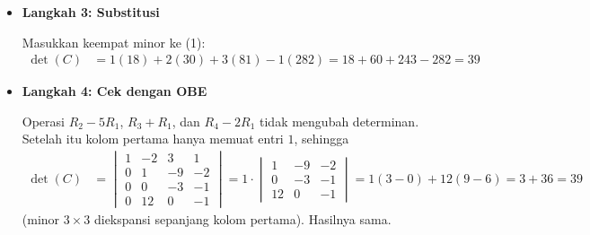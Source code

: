 \documentclass[10pt,a4paper]{article}
\begin{document}
\begin{enumerate}
\begin{enumerate}
\begin{itemize}
Hapus baris 1 dan kolom yang bersesuaian, lalu ekspansi setiap minor sepanjang baris pertamanya:
\begin{align}
M_{11} &= \begin{vmatrix} -9 & 6 & 3 \\ 2 & -6 & -2 \\ 8 & 6 & 1 \end{vmatrix}
= -9(-6 + 12) - 6(2 + 16) + 3(12 + 48) = -54 - 108 + 180 = 18 \\
M_{12} &= \begin{vmatrix} 5 & 6 & 3 \\ -1 & -6 & -2 \\ 2 & 6 & 1 \end{vmatrix}
= 5(-6 + 12) - 6(-1 + 4) + 3(-6 + 12) = 30 - 18 + 18 = 30 \\
M_{13} &= \begin{vmatrix} 5 & -9 & 3 \\ -1 & 2 & -2 \\ 2 & 8 & 1 \end{vmatrix}
= 5(2 + 16) + 9(-1 + 4) + 3(-8 - 4) = 90 + 27 - 36 = 81 \\
M_{14} &= \begin{vmatrix} 5 & -9 & 6 \\ -1 & 2 & -6 \\ 2 & 8 & 6 \end{vmatrix}
= 5(12 + 48) + 9(-6 + 12) + 6(-8 - 4) = 300 + 54 - 72 = 282
\end{align}

\item \textbf{Langkah 3: Substitusi}

Masukkan keempat minor ke (1):
\begin{align}
\det(C) &= 1(18) + 2(30) + 3(81) - 1(282) = 18 + 60 + 243 - 282 = 39
\end{align}

\item \textbf{Langkah 4: Cek dengan OBE}

Operasi $R_2 - 5R_1$, $R_3 + R_1$, dan $R_4 - 2R_1$ tidak mengubah determinan. Setelah itu kolom pertama hanya memuat entri $1$, sehingga
\begin{align}
\det(C) &= \begin{vmatrix} 1 & -2 & 3 & 1 \\ 0 & 1 & -9 & -2 \\ 0 & 0 & -3 & -1 \\ 0 & 12 & 0 & -1 \end{vmatrix}
= 1 \cdot \begin{vmatrix} 1 & -9 & -2 \\ 0 & -3 & -1 \\ 12 & 0 & -1 \end{vmatrix}
= 1(3 - 0) + 12(9 - 6) = 3 + 36 = 39
\end{align}
(minor $3 \times 3$ diekspansi sepanjang kolom pertama). Hasilnya sama.
\end{itemize}


\end{enumerate}
\end{enumerate}
\end{document}
